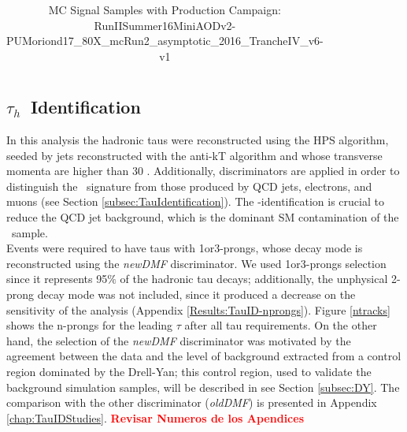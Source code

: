 \begin{table}[H]
\begin{center}
\begin{tabular}{| l | c | r | r |}
  \hline                                                                                                                                                                                                                                                         
  \end{tabular}                                                                                                                                                                                                                                                  
  \end{center}
  \caption{MC Signal Samples with Production Campaign: RunIISummer16MiniAODv2-PUMoriond17\_80X\_mcRun2\_asymptotic\_2016\_TrancheIV\_v6-v1}
  \label{tab:signal_samples}
\end{table}

\subsection{$\tau_{h}$~Identification}
\label{subsec:TauSelection}

\noindent In this analysis the hadronic taus were reconstructed 
using the HPS algorithm, seeded by jets reconstructed with 
the anti-kT algorithm and whose transverse momenta are higher 
than 30 \GeV. Additionally, discriminators are applied 
in order to distinguish the \tauh~signature from those produced by
QCD jets, electrons, and muons (see Section \ref{subsec:TauIdentification}).
The \tauh-identification is crucial to reduce the QCD jet background, 
which is the dominant SM contamination of the \Zprimetotauh~sample. \\

\noindent Events were required to have taus with 1or3-prongs, whose decay mode 
is reconstructed using the \textit{newDMF} discriminator. We used 1or3-prongs selection
since it represents 95$\%$ of the hadronic tau decays; additionally,
the unphysical 2-prong decay mode was not included, since it produced
a decrease on the sensitivity of the analysis (Appendix \ref{Results:TauID-nprongs}). 
Figure \ref{ntracks} shows the n-prongs for the leading $\tau$ after all tau requirements.
On the other hand, the selection of the \textit{newDMF} discriminator was motivated by the agreement between 
the data and the level of background extracted from a control region dominated by the Drell-Yan;
this control region, used to validate the background simulation samples, will be described in
see Section \ref{subsec:DY}. The comparison with the other discriminator (\textit{oldDMF}) is 
presented  in Appendix \ref{chap:TauIDStudies}.  \textbf{\textcolor{red}{Revisar Numeros de los Apendices}}\\


